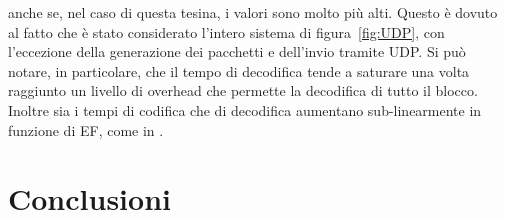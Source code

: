 \documentclass[italian, a4paper, 12pt]{article}
\begin{document}
anche se, nel
caso di questa tesina, i valori sono molto più alti. Questo è dovuto
al fatto che è stato considerato l'intero sistema di
figura~\ref{fig:UDP}, con l'eccezione della generazione dei pacchetti
e dell'invio tramite UDP.
%
Si può notare, in particolare, che il tempo di decodifica tende a
saturare una volta raggiunto un livello di overhead che permette la
decodifica di tutto il blocco.
%
Inoltre sia i tempi di codifica che di decodifica aumentano
sub-linearmente in funzione di EF, come in \cite{uep}.

\newpage
\section{Conclusioni} %



\printbibliography[heading=bibnumbered, title=Bibliografia]
\end{document}
